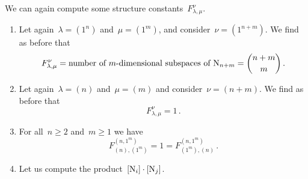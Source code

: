 \documentclass[a4paper, 11pt, twoside=semi]{scrartcl}
\begin{document}
\begin{example}
  \label{computing multiplication over F1}
  We can again compute some structure constants~$F^\nu_{\lambda, \mu}$.
  \begin{enumerate}
    \item
      Let again~$\lambda = (1^n)$ and~$\mu = (1^m)$, and consider~$\nu = (1^{n+m})$.
      We find as before that
      \[
        F^{\nu}_{\lambda, \mu}
        =
        \text{number of~\dimensional{$m$} subspaces of~$\Nil_{n+m}$}
        =
        \binom{n+m}{m} \,.
      \]
    \item
      Let again~$\lambda = (n)$ and~$\mu = (m)$ and consider~$\nu = (n+m)$.
      We find as before that
      \[
        F^{\nu}_{\lambda, \mu} = 1 \,.
      \]
    \item
      For all~$n \geq 2$ and~$m \geq 1$ we have
      \[
        F^{(n, 1^m)}_{(n), (1^m)}
        =
        1
        =
        F^{(n, 1^m)}_{(1^m), (n)} \,.
      \]
    \item
      Let us compute the product~$[\mathrm{N}_i] \cdot [\mathrm{N}_j]$.


\end{enumerate}
\end{example}
\end{document}
